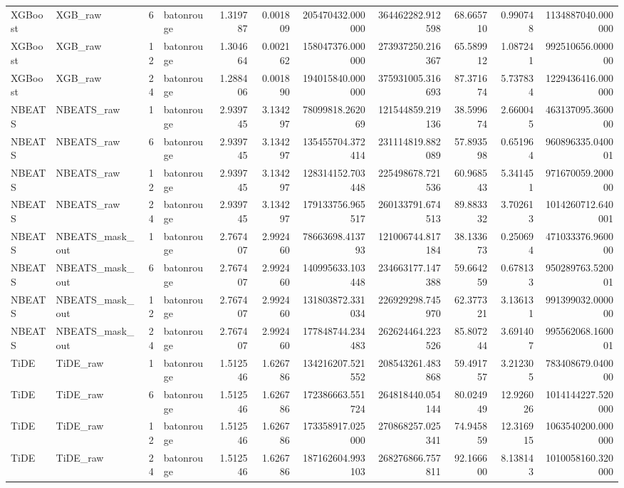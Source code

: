 \begin{longtable}{llrlrrrrrrr}
XGBoost & XGB\_raw & 6 & batonrouge & 1.319787 & 0.001809 & 205470432.000000 & 364462282.912598 & 68.665710 & 0.990748 & 1134887040.000000 \\
XGBoost & XGB\_raw & 12 & batonrouge & 1.304664 & 0.002162 & 158047376.000000 & 273937250.216367 & 65.589912 & 1.087241 & 992510656.000000 \\
XGBoost & XGB\_raw & 24 & batonrouge & 1.288406 & 0.001890 & 194015840.000000 & 375931005.316693 & 87.371674 & 5.737834 & 1229436416.000000 \\
NBEATS & NBEATS\_raw & 1 & batonrouge & 2.939745 & 3.134297 & 78099818.262069 & 121544859.219136 & 38.599674 & 2.660045 & 463137095.360000 \\
NBEATS & NBEATS\_raw & 6 & batonrouge & 2.939745 & 3.134297 & 135455704.372414 & 231114819.882089 & 57.893598 & 0.651964 & 960896335.040001 \\
NBEATS & NBEATS\_raw & 12 & batonrouge & 2.939745 & 3.134297 & 128314152.703448 & 225498678.721536 & 60.968543 & 5.341451 & 971670059.200000 \\
NBEATS & NBEATS\_raw & 24 & batonrouge & 2.939745 & 3.134297 & 179133756.965517 & 260133791.674513 & 89.883332 & 3.702613 & 1014260712.640001 \\
NBEATS & NBEATS\_mask\_out & 1 & batonrouge & 2.767407 & 2.992460 & 78663698.413793 & 121006744.817184 & 38.133673 & 0.250694 & 471033376.960000 \\
NBEATS & NBEATS\_mask\_out & 6 & batonrouge & 2.767407 & 2.992460 & 140995633.103448 & 234663177.147388 & 59.664259 & 0.678133 & 950289763.520001 \\
NBEATS & NBEATS\_mask\_out & 12 & batonrouge & 2.767407 & 2.992460 & 131803872.331034 & 226929298.745970 & 62.377321 & 3.136131 & 991399032.000000 \\
NBEATS & NBEATS\_mask\_out & 24 & batonrouge & 2.767407 & 2.992460 & 177848744.234483 & 262624464.223526 & 85.807244 & 3.691407 & 995562068.160001 \\
TiDE & TiDE\_raw & 1 & batonrouge & 1.512546 & 1.626786 & 134216207.521552 & 208543261.483868 & 59.491757 & 3.212305 & 783408679.040000 \\
TiDE & TiDE\_raw & 6 & batonrouge & 1.512546 & 1.626786 & 172386663.551724 & 264818440.054144 & 80.024949 & 12.926026 & 1014144227.520000 \\
TiDE & TiDE\_raw & 12 & batonrouge & 1.512546 & 1.626786 & 173358917.025000 & 270868257.025341 & 74.945859 & 12.316915 & 1063540200.000000 \\
TiDE & TiDE\_raw & 24 & batonrouge & 1.512546 & 1.626786 & 187162604.993103 & 268276866.757811 & 92.166600 & 8.138143 & 1010058160.320000 \\

\end{longtable}
